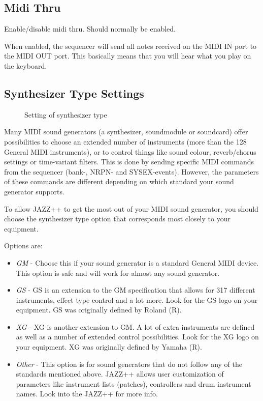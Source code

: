 \documentclass[letterpaper]{report}
\begin{document}
\subsection{Midi Thru}
Enable/disable midi thru. Should normally be enabled.

When enabled, the sequencer will send all notes received on
the MIDI IN port to the MIDI OUT port. This basically means that you will hear
what you play on the keyboard.

\subsection{Synthesizer Type Settings}\label{synthtype}

\begin{figure}%
%
%
\caption{Setting of synthesizer type}%
\end{figure}

Many MIDI sound generators (a synthesizer, soundmodule or soundcard) offer
possibilities to choose an extended number of instruments (more than
the 128 General MIDI instruments), or to control things like sound colour,
reverb/chorus settings or time-variant filters. This is done by sending
specific MIDI commands from the sequencer
(bank-, NRPN- and SYSEX-events). However, the parameters of
these commands are different depending on which standard your sound
generator supports.

To allow JAZZ++ to get the most out of your MIDI sound generator, you should
choose the synthesizer type option that corresponds most closely to your
equipment.

Options are:

\begin{itemize}

\item{\em GM}
- Choose this if your sound generator is a standard General MIDI device.
This option is safe and will work for almost any sound generator.

\item{\em GS}
- GS is an extension to the GM specification that allows for 317 different
instruments, effect type control and a lot more. Look for the GS logo on
your equipment. GS was originally defined by Roland (R).

\item{\em XG}
- XG is another extension to GM. A lot of extra instruments
are defined as well as a number of extended control possibilities. Look
for the XG logo on your equipment. XG was originally defined by
Yamaha (R).

\item{\em Other}
- This option is for sound generators that do not follow any of the standards
mentioned above. JAZZ++ allows user customization of parameters like
instrument lists (patches), controllers and drum instrument names. Look
into the JAZZ++  for more info.

\end{itemize}
\end{document}
